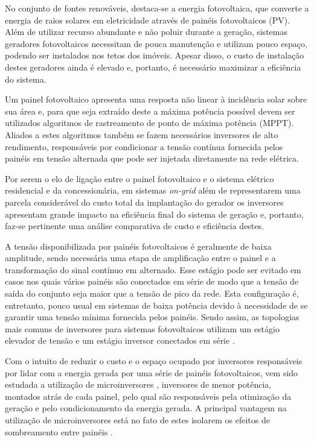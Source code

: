 \documentclass[
	12pt,				%
	openright,			%
	onseside,
	a4paper,			%
	english,			%
	french,				%
	spanish,			%
	brazil,				%
	]{abntex2}
\begin{document}
	No conjunto de fontes renováveis, destaca-se a energia fotovoltaica, que converte a energia de raios solares em eletricidade 
	através de painéis fotovoltaicos (PV). Além de utilizar recurso abundante e não poluir durante a geração, sistemas geradores 
	fotovoltaicos necessitam de pouca manutenção e utilizam pouco espaço, podendo ser instalados nos tetos dos imóveis.
	Apesar disso, o custo de instalação destes geradores ainda é elevado e, portanto, é necessário maximizar a eficiência do 
	sistema. 	

	Um painel fotovoltaico apresenta uma resposta não linear à incidência solar sobre sua área e, para que seja extraído deste 
	a máxima potência possível devem ser utilizados algoritmos de rastreamento de ponto de máxima potência (MPPT). Aliados a 
	estes algoritmos também se fazem necessários inversores de alto rendimento, responsáveis por condicionar a tensão 
	contínua fornecida pelos painéis em tensão alternada que pode ser injetada diretamente na rede elétrica.
	
 
	Por serem o elo de ligação entre o painel fotovoltaico e o sistema elétrico residencial e da concessionária, em sistemas \textit{on-grid} além de representarem uma parcela considerável do custo total da implantação do gerador os inversores apresentam 
	grande impacto na eficiência final do sistema de geração e, portanto, faz-se pertinente uma análise comparativa de custo e eficiência destes.


	A tensão disponibilizada por painéis fotovoltaicos é geralmente de baixa amplitude, sendo necessária uma etapa de amplificação 
	entre o painel e a transformação do sinal contínuo em alternado. Esse estágio pode ser evitado em casos nos quais vários painéis 
	são conectados em série de modo que a tensão de saída do conjunto seja maior que a tensão de pico da rede. Esta configuração 
	é, entretanto, pouco usual em sistemas de baixa potência devido à necessidade de se garantir uma tensão mínima fornecida pelos 
	painéis. Sendo assim, as topologias mais comuns de inversores para sistemas fotovoltaicos utilizam um estágio elevador de tensão e um estágio inversor conectados em série \cite{LUIGIJUNIOR_ev_int}.

	Com o intuito de reduzir o custo e o espaço ocupado por inversores responsáveis por lidar com a energia gerada por uma série de painéis fotovoltaicos, vem sido estudada a utilização de microinversores \cite{Bouzguenda_smart_grid_inv}, inversores de menor potência, montados atrás de cada painel, pelo qual são responsáveis pela otimização da geração e pelo condicionamento da energia gerada. A principal vantagem na utilização de microinversores está no fato de estes isolarem os efeitos de sombreamento entre painéis \cite{Nezamuddin_des_eff_micro}.
\end{document}
